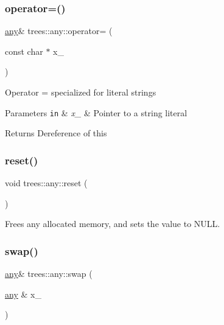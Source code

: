 \subsubsection{\texorpdfstring{operator=()}{operator=()}\hspace{0.1cm}{\footnotesize\ttfamily [2/2]}}
{\footnotesize\ttfamily \hyperlink{classtrees_1_1any}{any}\& trees\+::any\+::operator= (\begin{DoxyParamCaption}\item[{const char $\ast$}]{x\+\_\+ }\end{DoxyParamCaption})\hspace{0.3cm}{\ttfamily [inline]}}

Operator = specialized for literal strings


\begin{DoxyParams}[1]{Parameters}
\mbox{\tt in}  & {\em x\+\_\+} & Pointer to a string literal \\
\hline
\end{DoxyParams}
\begin{DoxyReturn}{Returns}
Dereference of this 
\end{DoxyReturn}
\mbox{\label{classtrees_1_1any_ad34b59c202e4c39dc229fe171589ad8a}} 
\subsubsection{\texorpdfstring{reset()}{reset()}}
{\footnotesize\ttfamily void trees\+::any\+::reset (\begin{DoxyParamCaption}{ }\end{DoxyParamCaption})\hspace{0.3cm}{\ttfamily [inline]}}

Frees any allocated memory, and sets the value to N\+U\+LL. \mbox{\label{classtrees_1_1any_ae40e8edda441ea943aac7f6a0f46edf0}} 
\subsubsection{\texorpdfstring{swap()}{swap()}}
{\footnotesize\ttfamily \hyperlink{classtrees_1_1any}{any}\& trees\+::any\+::swap (\begin{DoxyParamCaption}\item[{\hyperlink{classtrees_1_1any}{any} \&}]{x\+\_\+ }\end{DoxyParamCaption})\hspace{0.3cm}{\ttfamily [inline]}}

